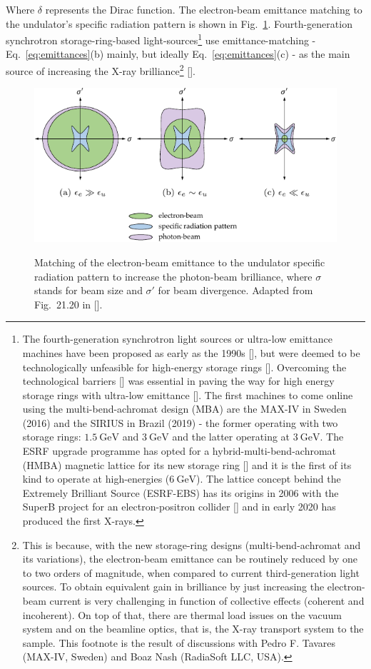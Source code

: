 \begin{refsection}
Where $\delta$ represents the Dirac function. The electron-beam emittance matching to the undulator's specific radiation pattern is shown in Fig.~\ref{fig:matching}. Fourth-generation synchrotron storage-ring-based light-sources\footnote{The fourth-generation synchrotron light sources or ultra-low emittance machines have been proposed as early as the 1990s [\cite{Einfeld1996, Einfeld2014}], but were deemed to be technologically unfeasible for high-energy storage rings [\cite{Ropert2000, Elleaume2003}]. Overcoming the technological barriers [\cite{Borland2014}] was essential in paving the way for high energy storage rings with ultra-low emittance [\cite{Bei2010, Eriksson2016}]. The first machines to come online using the multi-bend-achromat design (MBA) are the MAX-IV in Sweden (2016) and the SIRIUS in Brazil (2019) - the former operating with two storage rings: $1.5~\mathrm{GeV}$ and $3~\mathrm{GeV}$ and the latter operating at $3~\mathrm{GeV}$. The ESRF upgrade programme has opted for a hybrid-multi-bend-achromat (HMBA) magnetic lattice for its new storage ring [\cite{Biasci2014}] and it is the first of its kind to operate at high-energies ($6~\mathrm{GeV}$). The lattice concept behind the Extremely Brilliant Source (ESRF-EBS) has its origins in 2006 with the SuperB project for an electron-positron collider [\cite{Raimondi2017}] and in early 2020 has produced the first X-rays.} use emittance-matching - Eq.~\ref{eq:emittances}(b) mainly, but ideally Eq.~\ref{eq:emittances}(c) - as the main source of increasing the X-ray brilliance\footnote{This is because, with the new storage-ring designs (multi-bend-achromat and its variations), the electron-beam emittance can be routinely reduced by one to two orders of magnitude, when compared to current third-generation light sources. To obtain equivalent gain in brilliance by just increasing the electron-beam current is very challenging in function of collective effects (coherent and incoherent). On top of that, there are thermal load issues on the vacuum system and on the beamline optics, that is, the X-ray transport system to the sample. This footnote is the result of discussions with Pedro F. Tavares (MAX-IV, Sweden)  and Boaz Nash (RadiaSoft LLC, USA).} [\cite[\textit{§21.8.1}]{Wiedemann2015}].

\begin{figure}[t]
    \centering
    {\includegraphics[width=.6\linewidth]{figures/ch02/emittance.pdf}}
    \caption[Emittance matching]{Matching of the electron-beam emittance to the undulator specific radiation pattern to increase the photon-beam brilliance, where $\sigma$ stands for beam size and $\sigma'$ for beam divergence. Adapted from Fig.~21.20 in [\cite{Wiedemann2015}].}
    \label{fig:matching}
\end{figure}


\end{refsection}
